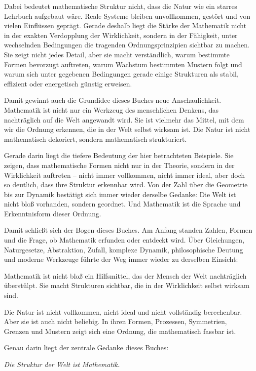 Dabei bedeutet mathematische Struktur nicht,
dass die Natur wie ein starres Lehrbuch aufgebaut wäre.
Reale Systeme bleiben unvollkommen,
gestört
und von vielen Einflüssen geprägt.
Gerade deshalb liegt die Stärke der Mathematik nicht in der exakten Verdopplung der Wirklichkeit,
sondern in der Fähigkeit,
unter wechselnden Bedingungen die tragenden Ordnungsprinzipien sichtbar zu machen.
Sie zeigt nicht jedes Detail,
aber sie macht verständlich,
warum bestimmte Formen bevorzugt auftreten,
warum Wachstum bestimmten Mustern folgt
und warum sich unter gegebenen Bedingungen gerade einige Strukturen
als stabil,
effizient
oder energetisch günstig erweisen.

Damit gewinnt auch die Grundidee dieses Buches neue Anschaulichkeit.
Mathematik ist nicht nur ein Werkzeug des menschlichen Denkens,
das nachträglich auf die Welt angewandt wird.
Sie ist vielmehr das Mittel,
mit dem wir die Ordnung erkennen,
die in der Welt selbst wirksam ist.
Die Natur ist nicht mathematisch dekoriert,
sondern mathematisch strukturiert.

Gerade darin liegt die tiefere Bedeutung der hier betrachteten Beispiele.
Sie zeigen,
dass mathematische Formen nicht nur in der Theorie,
sondern in der Wirklichkeit auftreten --
nicht immer vollkommen,
nicht immer ideal,
aber doch so deutlich,
dass ihre Struktur erkennbar wird.
Von der Zahl über die Geometrie bis zur Dynamik bestätigt sich immer wieder derselbe Gedanke:
Die Welt ist nicht bloß vorhanden,
sondern geordnet.
Und Mathematik ist die Sprache und Erkenntnisform dieser Ordnung.

\medskip

Damit schließt sich der Bogen dieses Buches.
Am Anfang standen Zahlen,
Formen
und die Frage,
ob Mathematik erfunden oder entdeckt wird.
Über Gleichungen,
Naturgesetze,
Abstraktion,
Zufall,
komplexe Dynamik,
philosophische Deutung
und moderne Werkzeuge führte der Weg immer wieder zu derselben Einsicht:

Mathematik ist nicht bloß ein Hilfsmittel,
das der Mensch der Welt nachträglich überstülpt.
Sie macht Strukturen sichtbar,
die in der Wirklichkeit selbst wirksam sind.

Die Natur ist nicht vollkommen,
nicht ideal
und nicht vollständig berechenbar.
Aber sie ist auch nicht beliebig.
In ihren Formen,
Prozessen,
Symmetrien,
Grenzen
und Mustern zeigt sich eine Ordnung,
die mathematisch fassbar ist.

Genau darin liegt der zentrale Gedanke dieses Buches:

\medskip

\begin{center}
	\emph{Die Struktur der Welt ist Mathematik.}
\end{center}
